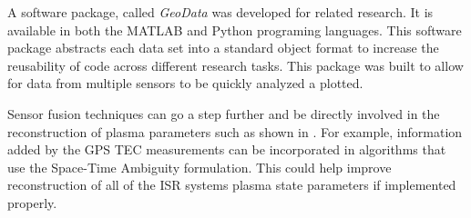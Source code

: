 A software package, called \textit{GeoData} was developed for related research. It is available in both the MATLAB \cite{john_swoboda_2016_154536} 
and Python \cite{john_swoboda_2016_154533} programing languages. This software package abstracts each data set into a standard object format to increase the reusability of code across different research tasks. This package was built to allow for data from multiple sensors to be quickly analyzed a plotted. 

Sensor fusion techniques can go a step further and be directly involved in the reconstruction of plasma parameters such as shown in \cite{Semeter:2016gm}. For example, information added by the GPS TEC measurements can be incorporated in algorithms that use the Space-Time Ambiguity formulation. This could help improve reconstruction of all of the ISR systems plasma state parameters if implemented properly.
